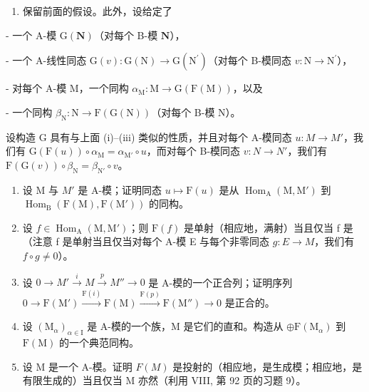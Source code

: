 \begin{enumerate}
\def\labelenumi{\arabic{enumi})}
\setcounter{enumi}{6}
\tightlist
\item
  保留前面的假设。此外，设给定了
\end{enumerate}

- 一个 A-模 \(\mathrm{G}(\mathbf{N})\)（对每个 B-模 \(\mathbf{N}\)），

- 一个 A-线性同态 \(\mathrm{G}(v):\mathrm{G}(\mathrm{N})\to \mathrm{G}(\mathrm{N}^{\prime})\)（对每个 B-模同态 \(v:\mathrm{N}\rightarrow \mathrm{N}^{\prime}\)），

- 对每个 A-模 M，一个同构 \(\alpha_{\mathrm{M}}: \mathrm{M} \to \mathrm{G}(\mathrm{F}(\mathrm{M}))\)，以及

- 一个同构 \(\beta_{\mathrm{N}}: \mathrm{N} \to \mathrm{F}(\mathrm{G}(\mathrm{N}))\)（对每个 B-模 \(\mathrm{N}\)）。

设构造 G 具有与上面 (i)–(iii) 类似的性质，并且对每个 A-模同态 \(u: M \to M'\)，我们有 \(\mathrm{G}(\mathrm{F}(u)) \circ \alpha_{\mathrm{M}} = \alpha_{\mathrm{M}'} \circ u\)，而对每个 B-模同态 \(v: N \to N'\)，我们有 \(\mathrm{F}(\mathrm{G}(v)) \circ \beta_{\mathrm{N}} = \beta_{\mathrm{N}'} \circ v\)。

\begin{enumerate}
\def\labelenumi{\alph{enumi})}
\item
  设 M 与 \(M'\) 是 A-模；证明同态 \(u \mapsto \mathrm{F}(u)\) 是从 \(\operatorname{Hom}_{\mathrm{A}}(\mathrm{M}, \mathrm{M}')\) 到 \(\operatorname{Hom}_{\mathrm{B}}(\mathrm{F}(\mathrm{M}), \mathrm{F}(\mathrm{M}'))\) 的同构。
\item
  设 \(f \in \operatorname{Hom}_{\mathrm{A}}(\mathrm{M}, \mathrm{M}')\)；则 \(\mathrm{F}(f)\) 是单射（相应地，满射）当且仅当 f 是（注意 f 是单射当且仅当对每个 A-模 E 与每个非零同态 \(g : E \to M\)，我们有 \(f \circ g \neq 0\)）。
\item
  设 \(0 \to M' \xrightarrow{i} M \xrightarrow{p} M'' \to 0\) 是 A-模的一个正合列；证明序列 \(0 \to \mathrm{F}(\mathrm{M}') \xrightarrow{\mathrm{F}(i)} \mathrm{F}(\mathrm{M}) \xrightarrow{\mathrm{F}(p)} \mathrm{F}(\mathrm{M}'') \to 0\) 是正合的。
\item
  设 \((\mathrm{M}_{\alpha})_{\alpha\in\mathrm{I}}\) 是 A-模的一个族，M 是它们的直和。构造从 \(\oplus\mathrm{F}(\mathrm{M}_{\alpha})\) 到 \(\mathrm{F}(\mathrm{M})\) 的一个典范同构。
\item
  设 M 是一个 A-模。证明 \(F(M)\) 是投射的（相应地，是生成模；相应地，是有限生成的）当且仅当 M 亦然（利用 VIII, 第 92 页的习题 9）。
\end{enumerate}

